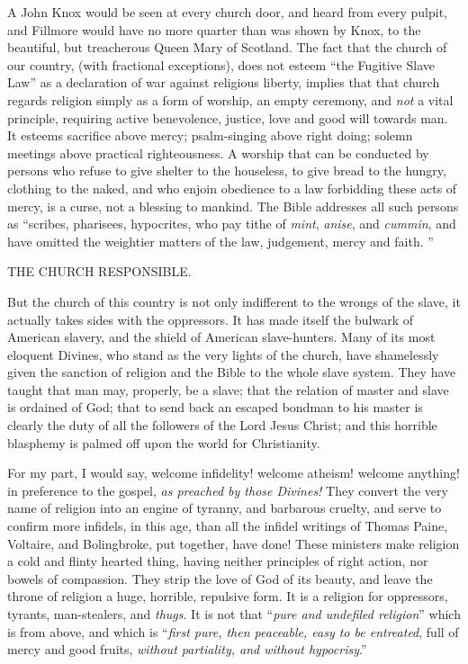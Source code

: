 A John Knox would be seen at every church door, and heard from every pulpit, and Fillmore would have no more quarter than was shown by Knox, to the beautiful, but treacherous Queen Mary of Scotland. The fact that the church of our country, (with fractional exceptions), does not esteem “the Fugitive Slave Law” as a declaration of war against religious liberty, implies that that church regards religion simply as a form of worship, an empty ceremony, and \textit{not} a vital principle, requiring active benevolence, justice, love and good will towards man. It esteems sacrifice above mercy; psalm-singing above right doing; solemn meetings above practical righteousness. A worship that can be conducted by persons who refuse to give shelter to the houseless, to give bread to the hungry, clothing to the naked, and who enjoin obedience to a law forbidding these acts of mercy, is a curse, not a blessing to mankind. The Bible addresses all such persons as “scribes, pharisees, hypocrites, who pay tithe of \textit{mint}, \textit{anise}, and \textit{cummin}, and have omitted the weightier matters of the law, judgement, mercy and faith. ”\par

THE CHURCH RESPONSIBLE.\par

But the church of this country is not only indifferent to the wrongs of the slave, it actually takes sides with the oppressors. It has made itself the bulwark of American slavery, and the shield of American slave-hunters. Many of its most eloquent Divines, who stand as the very lights of the church, have shamelessly given the sanction of religion and the Bible to the whole slave system. They have taught that man may, properly, be a slave; that the relation of master and slave is ordained of God; that to send back an escaped bondman to his master is clearly the duty of all the followers of the Lord Jesus Christ; and this horrible blasphemy is palmed off upon the world for Christianity.\par

For my part, I would say, welcome infidelity! welcome atheism! welcome anything! in preference to the gospel, \textit{as preached by those Divines!} They convert the very name of religion into an engine of tyranny, and barbarous cruelty, and serve to confirm more infidels, in this age, than all the infidel writings of Thomas Paine, Voltaire, and Bolingbroke, put together, have done! These ministers make religion a cold and flinty hearted thing, having neither principles of right action, nor bowels of compassion. They strip the love of God of its beauty, and leave the throne of religion a huge, horrible, repulsive form. It is a religion for oppressors, tyrants, man-stealers, and \textit{thugs}. It is not that “\textit{pure and undefiled religion}” which is from above, and which is “\textit{first pure, then peaceable, easy to be entreated}, full of mercy and good fruits, \textit{without partiality, and without hypocrisy}.”\par

